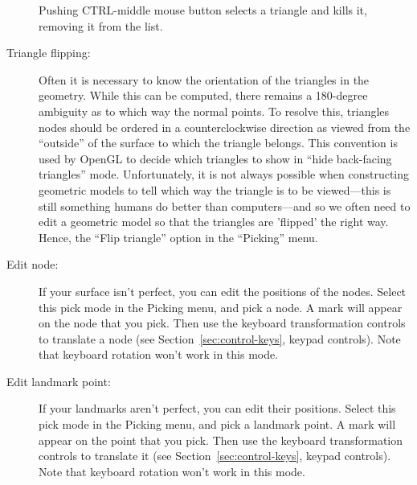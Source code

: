 \begin{description}
    Pushing CTRL-middle mouse button selects a triangle and kills it,
    removing it from the list.

    
  \item[Triangle flipping: ] Often it is necessary to know the orientation
    of the triangles in the geometry.  While this can be computed, there
    remains a 180-degree ambiguity as to which way the normal points.  To
    resolve this, triangles nodes should be ordered in a counterclockwise
    direction as viewed from the ``outside'' of the surface to which the
    triangle belongs.  This convention is used by OpenGL to decide which
    triangles to show in ``hide back-facing triangles'' mode.
    Unfortunately, it is not always possible when constructing geometric
    models to tell which way the triangle is to be viewed---this is still
    something humans do better than computers---and so we often need to
    edit a geometric model so that the triangles are 'flipped' the right
    way.  Hence, the ``Flip triangle'' option in the ``Picking'' menu.
    
  \item[Edit node: ] If your surface isn't perfect, you can edit the
    positions of the nodes.  Select this pick mode in the Picking menu, and
    pick a node.  A mark will appear on the node that you pick.  Then use
    the keyboard transformation controls to translate a node (see
    Section~\ref{sec:control-keys}, keypad controls).  Note that keyboard
    rotation won't work in this mode.
    
  \item[Edit landmark point: ] If your landmarks aren't perfect, you can
    edit their positions.  Select this pick mode in the Picking menu, and
    pick a landmark point.  A mark will appear on the point that you pick.
    Then use the keyboard transformation controls to translate it (see
    Section~\ref{sec:control-keys}, keypad controls).  Note that keyboard
    rotation won't work in this mode.
    

\end{description}
